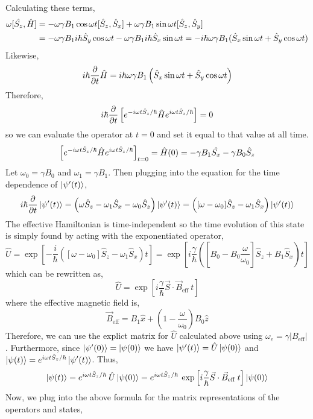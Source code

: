 \documentclass[12pt]{extarticle}
\begin{document}
Calculating these terms,
\begin{align*}
\omega [\hat{S_z}, \hat{H}] & = - \omega \gamma B_1 \cos{\omega t} [\hat{S}_z, \hat{S}_x] + \omega \gamma B_1 \sin{\omega t} [\hat{S}_z, \hat{S}_y] \\ & = - \omega \gamma B_1 i \hbar \hat{S}_y \cos{\omega t} - \omega \gamma B_1 i \hbar \hat{S}_x \sin{\omega t} = - i \hbar \omega \gamma B_1 (\hat{S}_x \sin{\omega t} + \hat{S}_y \cos{\omega t})
\end{align*}
Likewise,
\[ i \hbar \frac{\partial{}}{\partial{t}} \hat{H} = i \hbar \omega \gamma B_1 \left(\hat{S}_x \sin{\omega t} + \hat{S}_y \cos{\omega t} \right) \]
Therefore, 
\[i \hbar \frac{\partial{}}{\partial{t}} \left[ e^{-i \omega t \hat{S}_z / \hbar} \hat{H} e^{i \omega t \hat{S}_z / \hbar} \right] = 0\] 
so we can evaluate the operator at $t = 0$ and set it equal to that value at all time.
\[\left[ e^{-i \omega t \hat{S}_z / \hbar} \hat{H} e^{i \omega t \hat{S}_z / \hbar} \right]_{t = 0} = \hat{H}(0) = - \gamma B_1 \hat{S_x} - \gamma B_0 \hat{S}_z\]
Let $\omega_0 = \gamma B_0$ and $\omega_1 = \gamma B_1$. Then plugging into the equation for the time dependence of $\left| \psi'(t) \right>$,
\[ i\hbar \frac{\partial{}}{\partial{t}} \left| \psi'(t) \right> = \left( \omega \hat{S}_z - \omega_1 \hat{S}_x - \omega_0 \hat{S}_z \right) \left| \psi'(t) \right> = \left( [\omega - \omega_0] \hat{S}_z - \omega_1 \hat{S}_x \right) \left| \psi'(t) \right> \] 
The effective Hamiltonian is time-independent so the time evolution of this state is simply found by acting with the exponentiated operator,
\[ \hat{U} = \exp{\left[- \frac{i}{\hbar} \left( [\omega - \omega_0] \hat{S}_z - \omega_1 \hat{S}_x \right) t \right]} = \exp{\left[i \frac{\gamma}{\hbar} \left( [B_0 - B_0 \frac{\omega}{\omega_0} ] \hat{S}_z + B_1 \hat{S}_x \right) t \right]} \]
which can be rewritten as,
\[ \hat{U} = \exp{\left[i \frac{\gamma}{\hbar} \vec{S} \cdot \vec{B}_{\mathrm{eff}} \: t \right]} \]
where the effective magnetic field is,
\[\vec{B}_{\mathrm{eff}} = B_1 \hat{x} + \left(1 - \frac{\omega}{\omega_0} \right) B_0 \hat{z} \]
Therefore, we can use the explict matrix for $\hat{U}$ calculated above using $\omega_{e} = \gamma |B_{\mathrm{eff}}| $. 
Furthermore, since $\left| \psi'(0) \right> = \left| \psi(0) \right>$ we have $\left| \psi'(t) \right> = \hat{U} \left| \psi(0) \right>$ and $\left| \psi(t) \right> = e^{i \omega t \hat{S}_z / \hbar} \left| \psi'(t) \right>$. 
Thus,
\[ \left| \psi(t) \right> = e^{i \omega t \hat{S}_z / \hbar} \: \hat{U} \left| \psi(0) \right> = e^{i \omega t \hat{S}_z / \hbar} \: \exp{\left[i \frac{\gamma}{\hbar} \vec{S} \cdot \vec{B}_{\mathrm{eff}} \: t \right]} \left| \psi(0) \right> \]
Now, we plug into the above formula for the matrix representations of the operators and states,
\end{document}
